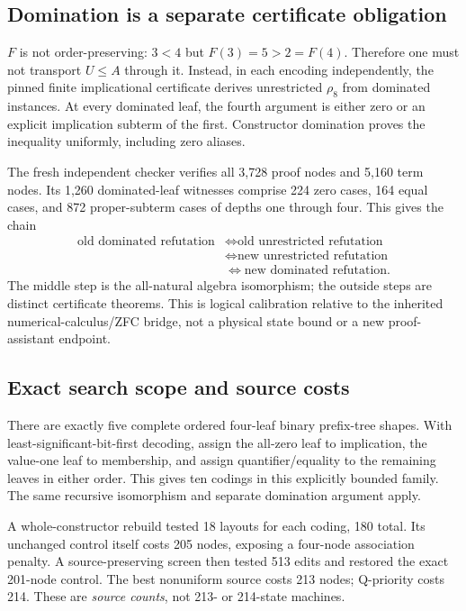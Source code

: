 \documentclass[11pt]{article}
\begin{document}
\subsection*{Domination is a separate certificate obligation}
$F$ is not order-preserving: $3<4$ but $F(3)=5>2=F(4)$. Therefore one must not transport $U\le A$ through it. Instead, in each encoding independently, the pinned finite implicational certificate derives unrestricted $\rho_8$ from dominated instances. At every dominated leaf, the fourth argument is either zero or an explicit implication subterm of the first. Constructor domination proves the inequality uniformly, including zero aliases.

The fresh independent checker verifies all 3,728 proof nodes and 5,160 term nodes. Its 1,260 dominated-leaf witnesses comprise 224 zero cases, 164 equal cases, and 872 proper-subterm cases of depths one through four. This gives the chain
\begin{align*}
 \text{old dominated refutation}&\Longleftrightarrow\text{old unrestricted refutation}\\
 &\Longleftrightarrow\text{new unrestricted refutation}\\
 &\Longleftrightarrow\text{new dominated refutation}.
\end{align*}
The middle step is the all-natural algebra isomorphism; the outside steps are distinct certificate theorems. This is logical calibration relative to the inherited numerical-calculus/ZFC bridge, not a physical state bound or a new proof-assistant endpoint.

\subsection*{Exact search scope and source costs}
There are exactly five complete ordered four-leaf binary prefix-tree shapes. With least-significant-bit-first decoding, assign the all-zero leaf to implication, the value-one leaf to membership, and assign quantifier/equality to the remaining leaves in either order. This gives ten codings in this explicitly bounded family. The same recursive isomorphism and separate domination argument apply.

A whole-constructor rebuild tested 18 layouts for each coding, 180 total. Its unchanged control itself costs 205 nodes, exposing a four-node association penalty. A source-preserving screen then tested 513 edits and restored the exact 201-node control. The best nonuniform source costs 213 nodes; Q-priority costs 214. These are \emph{source counts}, not 213- or 214-state machines.
\end{document}
